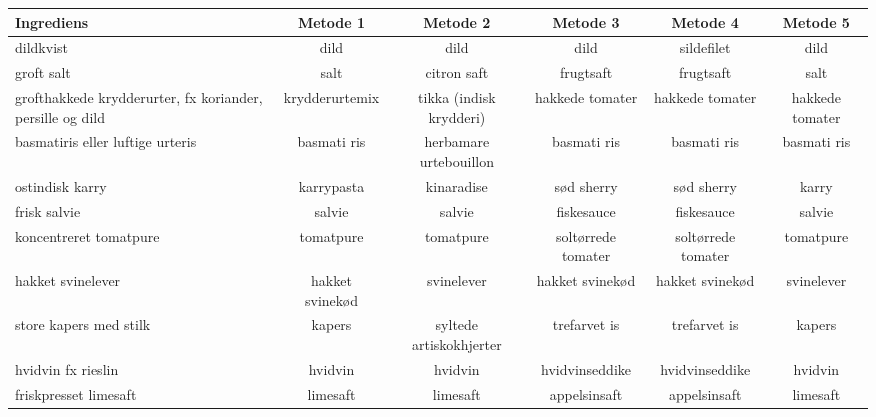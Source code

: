 \begin{table}
    \begin{tabular}{|p{2cm}|c|c|c|c|c|}
        \hline
        Ingrediens                                                 & Metode 1        & Metode 2                & Metode 3           & Metode 4           & Metode 5        \\ \hline
        dildkvist                                                  & dild            & dild                    & dild               & sildefilet         & dild            \\ \hline
        groft salt                                                 & salt            & citron saft             & frugtsaft          & frugtsaft          & salt            \\ \hline
        grofthakkede krydderurter, fx koriander, persille og dild & krydderurtemix  & tikka (indisk krydderi) & hakkede tomater    & hakkede tomater    & hakkede tomater \\ \hline
        basmatiris eller luftige urteris                           & basmati ris     & herbamare urtebouillon  & basmati ris        & basmati ris        & basmati ris     \\ \hline
        ostindisk karry                                            & karrypasta      & kinaradise              & sød sherry         & sød sherry         & karry           \\ \hline
        frisk salvie                                               & salvie          & salvie                  & fiskesauce         & fiskesauce         & salvie          \\ \hline
        koncentreret tomatpure                                     & tomatpure       & tomatpure               & soltørrede tomater & soltørrede tomater & tomatpure       \\ \hline
        hakket svinelever                                          & hakket svinekød & svinelever              & hakket svinekød    & hakket svinekød    & svinelever      \\ \hline
        store kapers med stilk                                     & kapers          & syltede artiskokhjerter & trefarvet is       & trefarvet is       & kapers          \\ \hline
        hvidvin fx rieslin                                         & hvidvin         & hvidvin                 & hvidvinseddike     & hvidvinseddike     & hvidvin         \\ \hline
        friskpresset limesaft                                      & limesaft        & limesaft                & appelsinsaft       & appelsinsaft       & limesaft        \\ \hline

\end{tabular}
\end{table}
